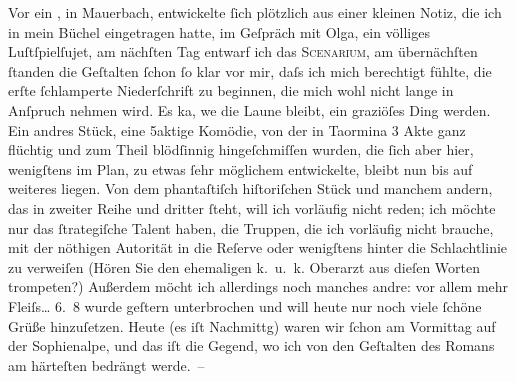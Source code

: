 \pstart
           Vor ein \label{K_L01422-2v}\label{K_L01422-2}, in Mauerbach, entwickelte ſich plötzlich
               aus einer kleinen Notiz, die ich in mein Büchel eingetragen hatte, im Geſpräch mit
                  Olga, ein völliges Luſtſpielſujet, am nächſten Tag ent{\pb}warf ich das \textsc{Scenarium}, am
               übernächſten ſtanden die Geſtalten ſchon ſo klar vor mir, daſs ich mich berechtigt
               fühlte, die erſte ſchlamperte Niederſchrift zu beginnen, die mich wohl nicht lange in
               Anſpruch nehmen wird. Es ka{\geminationn}, we{\geminationn} die Laune bleibt, ein graziöſes Ding werden. Ein
               andres Stück, eine 5aktige
                  Komödie, von der in Taormina 3 Akte ganz
               flüchtig und zum Theil blödſinnig hingeſchmiſſen wurden, die ſich aber hier,
               wenigſtens im Plan, zu etwas ſehr möglichem entwickelte, {\pb}bleibt nun bis auf weiteres liegen. Von dem phantaſtiſch hiſtoriſchen Stück und manchem andern, das
               in zweiter Reihe und dritter ſteht, will ich vorläufig nicht reden; ich möchte nur
               das ſtrategiſche Talent haben, die Truppen, die ich vorläufig nicht brauche, mit der
               nöthigen Autorität in die Reſerve oder wenigſtens hinter die Schlachtlinie zu
               verweiſen (Hören Sie den ehemaligen k. u. k. Oberarzt aus dieſen Worten trompeten?)
               Außerdem {\pb}möcht ich allerdings noch manches andre: vor
               allem mehr Fleiſs{\dots}\pend
           \vspace{1em}
\pstart
           \raggedleft{}6. 8\pend
           \vspace{0.5em}
\pstart
           wurde geſtern unterbrochen und will heute nur noch viele ſchöne Grüße hinzuſetzen.
               Heute (es iſt Nachmittg) waren wir ſchon am Vormittag auf
               der Sophienalpe, und das iſt die Gegend, wo ich
               von den Geſtalten des Romans
               am härteſten bedrängt werde. –\pend
           
